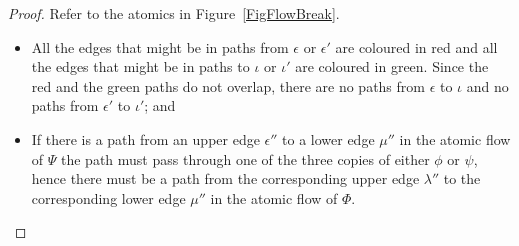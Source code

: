 
\begin{proof}
Refer to the atomics in Figure~\ref{FigFlowBreak}.
\begin{itemize}
	\item All the edges that might be in paths from $\epsilon$ or $\epsilon'$ are coloured in red and all the edges that might be in paths to $\iota$ or $\iota'$ are coloured in green. Since the red and the green paths do not overlap, there are no paths from $\epsilon$ to $\iota$ and no paths from $\epsilon'$ to $\iota'$; and
	\item If there is a path from an upper edge $\epsilon''$ to a lower edge $\mu''$ in the atomic flow of $\Psi$ the path must pass through one of the three copies of either $\phi$ or $\psi$, hence there must be a path from the corresponding upper edge $\lambda''$ to the corresponding lower edge $\mu''$ in the atomic flow of $\Phi$.
\end{itemize}
\end{proof}
